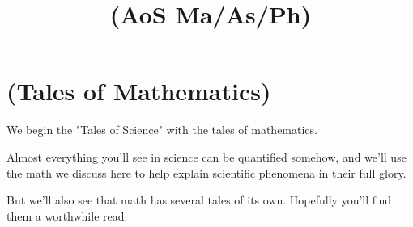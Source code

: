 \documentclass{book}
\title{(AoS Ma/As/Ph)}
\date{\vspace{-5ex}}
\theoremstyle{problemstyle}
\begin{document}
\maketitle

\part{(Tales of Mathematics)}

We begin the "Tales of Science" with the tales of mathematics. 

Almost everything you'll see in science can be quantified somehow, and we'll use the math we discuss here to help explain scientific phenomena in their full glory. 

But we'll also see that math has several tales of its own. Hopefully you'll find them a worthwhile read. 





\end{document}
